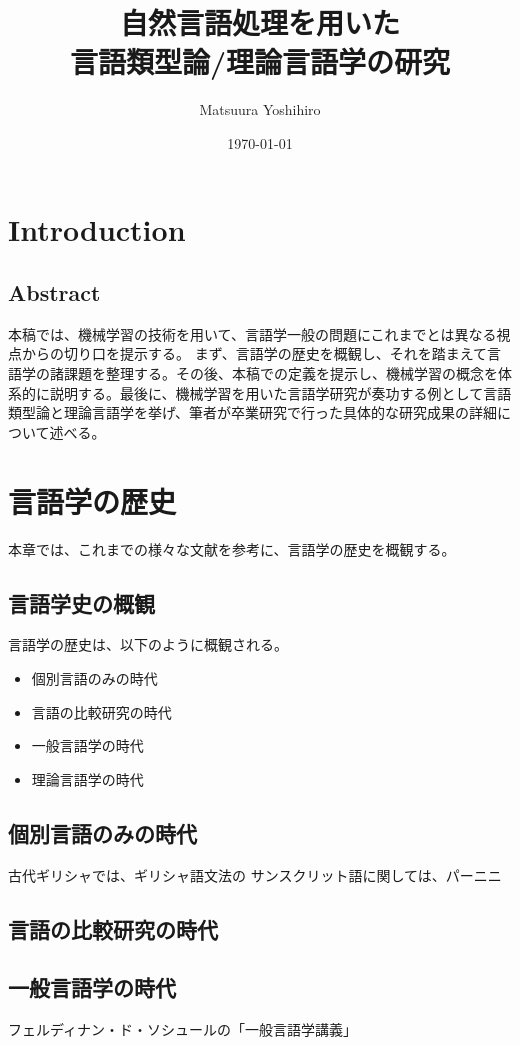 \documentclass[12pt, oneside]{book} %
\title{自然言語処理を用いた\\言語類型論/理論言語学の研究}
\author{Matsuura Yoshihiro} %
\date{\today} %
\begin{document}
\maketitle

\tableofcontents

\mainmatter
\part{Introduction}
\chapter{Abstract}
本稿では、機械学習の技術を用いて、言語学一般の問題にこれまでとは異なる視点からの切り口を提示する。
まず、言語学の歴史を概観し、それを踏まえて言語学の諸課題を整理する。その後、本稿での定義を提示し、機械学習の概念を体系的に説明する。最後に、機械学習を用いた言語学研究が奏功する例として言語類型論と理論言語学を挙げ、筆者が卒業研究で行った具体的な研究成果の詳細について述べる。

\part{言語学の歴史}
本章では、これまでの様々な文献を参考に、言語学の歴史を概観する。
\chapter{言語学史の概観}
言語学の歴史は、以下のように概観される。
\begin{itemize}
    \item 個別言語のみの時代
    \item 言語の比較研究の時代
    \item 一般言語学の時代
    \item 理論言語学の時代
\end{itemize}
\chapter{個別言語のみの時代}
古代ギリシャでは、ギリシャ語文法の
サンスクリット語に関しては、パーニニ
\chapter{言語の比較研究の時代}
\chapter{一般言語学の時代}
フェルディナン・ド・ソシュールの「一般言語学講義」
\end{document}
